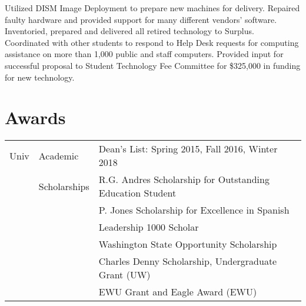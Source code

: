 \documentclass[]{deedy-resume-openfont}
\begin{document}
\begin{minipage}[t]{0.66\textwidth}
\sectionsep

Utilized DISM Image Deployment to prepare new machines for delivery. Repaired faulty hardware and provided support for many different vendors’ software. Inventoried, prepared and delivered all retired technology to Surplus. Coordinated with other students to respond to Help Desk requests for computing assistance on more than 1,000 public and staff computers. Provided input for successful proposal to Student Technology Fee Committee for \$325,000 in funding for new technology.
\sectionsep


\section{Awards} 
\begin{tabular}{rll}
Univ& Academic & Dean's List: Spring 2015, Fall 2016, Winter 2018\\
 & Scholarships & R.G. Andres Scholarship for Outstanding Education Student\\
 & & P. Jones Scholarship for Excellence in Spanish\\
 & & Leadership 1000 Scholar \\
 & & Washington State Opportunity Scholarship\\
 & & Charles Denny Scholarship, Undergraduate Grant (UW)\\
 & & EWU Grant and Eagle Award (EWU)\\


\end{tabular}
\sectionsep



\end{minipage}
\end{document}
